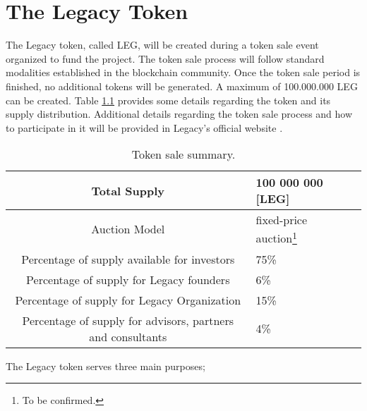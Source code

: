 \chapter{The Legacy Token} %
\label{cha:the_legacy_token}

The Legacy token, called LEG, will be created during a token sale event organized to fund the project. The token sale process will follow standard modalities established in the blockchain community. Once the token sale period is finished, no additional tokens will be generated. A maximum of 100.000.000 LEG can be created. 
Table \ref{table:ico_summary} provides some details regarding the token and its supply distribution. Additional details regarding the token sale process and how to participate in it will be provided in Legacy's official website \cite{Legacy}.

\begin{table}[h]
	\begin{center}		
		{\renewcommand{\arraystretch}{1.3}			
			\begin{tabular}{| c | p{5cm} | p{3.5cm}  |}	
		    \hline	
		    	Total Supply		&  100 000 000 [LEG]  \\ \hline
		    	Auction Model       &  fixed-price auction\footnote{To be confirmed.} \\ \hline														
				Percentage of supply available for investors & 75\% \\ \hline
				Percentage of supply for Legacy founders     &  6\% \\ \hline
				Percentage of supply for Legacy Organization & 15\% \\ \hline
				Percentage of supply for advisors, partners and consultants & 4\% \\
			\hline	
			\end{tabular}				
		}
	\caption{Token sale summary.}
	\label{table:ico_summary}		
	\end{center}
\end{table}



The Legacy token serves three main purposes;

